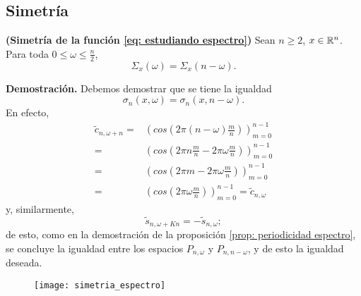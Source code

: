 \subsection{Simetría}
\begin{prop}
\textbf{(Simetría de la función
\eqref{eq: estudiando espectro})}
Sean
$n \geq 2$,
$x \in \mathbb{R}^{n}$. Para toda $0 \leq \omega \leq \frac{n}{2}$,
\[
\Sigma_{x}(\omega) = \Sigma_{x}(n-\omega).
\]
\end{prop}
\noindent
\textbf{Demostración.}
Debemos demostrar que se tiene la igualdad 
\[
\sigma_{n}(x, \omega) = 
\sigma_{n}(x, n-\omega ).
\]
En efecto, 
\begin{align*}
\tilde{c}_{n, \omega + n} = & \left( cos \left( 2 \pi
\left( n- \omega \right) \frac{m}{n} \right) \right)_{m=0}^{n-1} \\
= & \left( cos \left( 
2 \pi n \frac{m}{n} - 2 \pi \omega
\frac{m}{n}
\right) \right)_{m=0}^{n-1} \\
= & \left( cos \left( 
2 \pi m - 2 \pi \omega \frac{m}{n} 
\right) \right)_{m=0}^{n-1} \\
= & \left( cos \left( 2 \pi \omega \frac{m}{n} \right) \right)_{m=0}^{n-1}
= \tilde{c}_{n, \omega}
\end{align*}
y, similarmente,
\[
\tilde{s}_{n, \omega + Kn} = -\tilde{s}_{n, \omega};
\]
de esto, como en la demostración de la proposición
\ref{prop: periodicidad espectro}, se concluye la igualdad
entre los espacios $P_{n, \omega}$ y $P_{n, n-\omega}$, y de esto
la igualdad deseada.
\QEDB
\vspace{0.2cm}

\begin{figure}[H]
	\centering
	\texttt{[image: simetria\_espectro]} 
\end{figure}	
 

